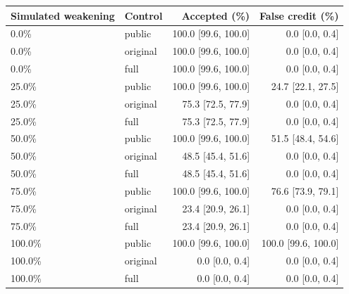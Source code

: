\begin{tabular}{llrr}\toprule
Simulated weakening & Control & Accepted (\%) & False credit (\%) \\ \midrule
0.0\% & public & 100.0 [99.6, 100.0] & 0.0 [0.0, 0.4] \\
0.0\% & original & 100.0 [99.6, 100.0] & 0.0 [0.0, 0.4] \\
0.0\% & full & 100.0 [99.6, 100.0] & 0.0 [0.0, 0.4] \\
25.0\% & public & 100.0 [99.6, 100.0] & 24.7 [22.1, 27.5] \\
25.0\% & original & 75.3 [72.5, 77.9] & 0.0 [0.0, 0.4] \\
25.0\% & full & 75.3 [72.5, 77.9] & 0.0 [0.0, 0.4] \\
50.0\% & public & 100.0 [99.6, 100.0] & 51.5 [48.4, 54.6] \\
50.0\% & original & 48.5 [45.4, 51.6] & 0.0 [0.0, 0.4] \\
50.0\% & full & 48.5 [45.4, 51.6] & 0.0 [0.0, 0.4] \\
75.0\% & public & 100.0 [99.6, 100.0] & 76.6 [73.9, 79.1] \\
75.0\% & original & 23.4 [20.9, 26.1] & 0.0 [0.0, 0.4] \\
75.0\% & full & 23.4 [20.9, 26.1] & 0.0 [0.0, 0.4] \\
100.0\% & public & 100.0 [99.6, 100.0] & 100.0 [99.6, 100.0] \\
100.0\% & original & 0.0 [0.0, 0.4] & 0.0 [0.0, 0.4] \\
100.0\% & full & 0.0 [0.0, 0.4] & 0.0 [0.0, 0.4] \\
\bottomrule\end{tabular}
